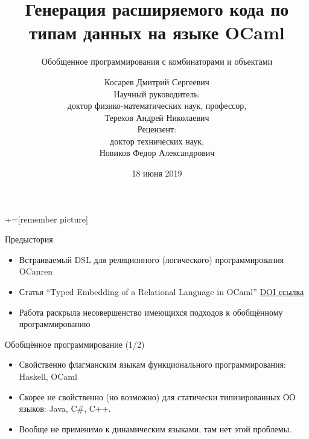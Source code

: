 \documentclass[
  russian,
  aspectratio=43,
  xcolor={svgnames},
  hyperref={colorlinks,citecolor=DeepPink4,linkcolor=DarkRed,urlcolor=DarkBlue}]{beamer}
\title{Генерация расширяемого кода по типам данных на языке OCaml}
\subtitle{Обобщенное программирования с комбинаторами и объектами}
\author[Косарев Дмитрий]{Косарев Дмитрий Сергеевич\\
[2mm]{\small 
Научный руководитель: \\доктор физико-математических наук, профессор, \\
Терехов Андрей Николаевич \\ \vspace{1mm} 
Рецензент: \\
доктор технических наук, \\Новиков Федор Александрович}
}
\date{18 июня 2019} %
\begin{document}
\maketitle

+=[remember picture]

\everymath{\displaystyle}



\begin{frame}[fragile]{Предыстория}
\begin{itemize}
 \item Встраиваемый DSL для реляционного (логического) программирования OCanren
 \item Статья ``Typed Embedding of a Relational Language in OCaml'' \href{http://dx.doi.org/10.4204/EPTCS.285.1}{DOI ссылка}
 \item Работа раскрыла несовершенство имеющихся подходов к обобщённому программированию
\end{itemize}
\end{frame}

\begin{frame}[fragile]{Обобщённое программирование (1/2)}
\begin{itemize}
 \item Свойственно флагманским языкам функционального программирования: Haskell, OCaml
 \item Скорее не свойственно (но возможно) для статически типизированных ОО языков: Java, C\#, C++.
 \item Вообще не применимо к динамическим языками, там нет этой проблемы.
\end{itemize}
\end{frame}
\end{document}
